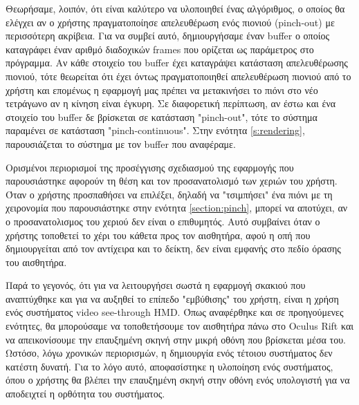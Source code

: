 Θεωρήσαμε, λοιπόν, ότι είναι καλύτερο να υλοποιηθεί ένας αλγόριθμος, ο οποίος θα ελέγχει αν ο χρήστης πραγματοποίησε απελευθέρωση ενός πιονιού (pinch-out) με περισσότερη ακρίβεια. Για να συμβεί αυτό, δημιουργήσαμε έναν buffer ο οποίος καταγράφει έναν αριθμό διαδοχικών frames που ορίζεται ως παράμετρος στο πρόγραμμα. Αν κάθε στοιχείο του buffer έχει καταγράψει κατάσταση απελευθέρωσης πιονιού, τότε θεωρείται ότι έχει όντως πραγματοποιηθεί απελευθέρωση πιονιού από το χρήστη και επομένως η εφαρμογή μας πρέπει να μετακινήσει το πιόνι στο νέο τετράγωνο αν η κίνηση είναι έγκυρη. Σε διαφορετική περίπτωση, αν έστω και ένα στοιχείο του buffer δε βρίσκεται σε κατάσταση "pinch-out", τότε το σύστημα παραμένει σε κατάσταση "pinch-continuous". Στην ενότητα \ref{s:rendering}, παρουσιάζεται το σύστημα με τον buffer που αναφέραμε. 



Ορισμένοι περιορισμοί της προσέγγισης σχεδιασμού της εφαρμογής που παρουσιάστηκε αφορούν τη θέση και τον προσανατολισμό των χεριών του χρήστη. Όταν ο χρήστης προσπαθήσει να επιλέξει, δηλαδή να "τσιμπήσει" ένα πιόνι με τη χειρονομία που παρουσιάστηκε στην ενότητα \ref{section:pinch}, μπορεί να αποτύχει, αν ο προσανατολισμος του χεριού δεν είναι ο επιθυμητός. Αυτό συμβαίνει όταν ο χρήστης τοποθετεί το χέρι του κάθετα προς τον αισθητήρα, αφού η οπή που δημιουργείται από τον αντίχειρα και το δείκτη, δεν είναι εμφανής στο πεδίο όρασης του αισθητήρα.




Παρά το γεγονός, ότι για να λειτουργήσει σωστά η εφαρμογή σκακιού που αναπτύχθηκε και για να αυξηθεί το επίπεδο "εμβύθισης" του χρήστη, είναι η χρήση ενός συστήματος video see-through HMD. Όπως αναφέρθηκε και σε προηγούμενες ενότητες, θα μπορούσαμε να τοποθετήσουμε τον αισθητήρα πάνω στο Oculus Rift και να απεικονίσουμε την επαυξημένη σκηνή στην μικρή οθόνη που βρίσκεται μέσα του. Ωστόσο, λόγω χρονικών περιορισμών, η δημιουργία ενός τέτοιου συστήματος δεν κατέστη δυνατή. Για το λόγο αυτό, αποφασίστηκε η υλοποίηση ενός συστήματος, όπου ο χρήστης θα βλέπει την επαυξημένη σκηνή στην οθόνη ενός υπολογιστή για να αποδειχτεί η ορθότητα του συστήματος. 






